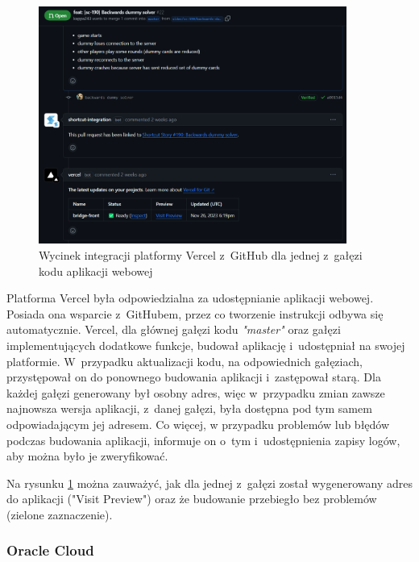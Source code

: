 \begin{figure}[!]
    \centering
    \includegraphics[width=0.9\textwidth]{img/github/github-vercel.png}
    \caption{Wycinek integracji platformy Vercel z~GitHub dla jednej z~gałęzi kodu aplikacji webowej}
    \label{fig:github-vercel}
\end{figure}

Platforma Vercel\cite{Vercel} była odpowiedzialna za
udostępnianie aplikacji webowej. Posiada ona wsparcie \mbox{z~GitHubem},
przez co tworzenie instrukcji odbywa się automatycznie.
Vercel, dla głównej gałęzi kodu \textit{"master"} oraz
gałęzi implementujących dodatkowe funkcje, budował aplikację
i~udostępniał na swojej platformie. W~przypadku aktualizacji
kodu, na odpowiednich gałęziach, przystępował on do ponownego
budowania aplikacji i~zastępował starą. Dla każdej gałęzi
generowany był osobny adres, więc w~przypadku zmian zawsze
najnowsza wersja aplikacji, z~danej gałęzi, była dostępna pod
tym samem odpowiadającym jej adresem. Co więcej, w przypadku
problemów lub błędów podczas budowania aplikacji, informuje
on o~tym i~udostępnienia zapisy logów, aby można było je
zweryfikować.

Na rysunku
\ref{fig:github-vercel} można zauważyć, jak dla jednej
z~gałęzi został wygenerowany adres do aplikacji
("Visit Preview") oraz że budowanie przebiegło bez problemów
(zielone zaznaczenie).

\FloatBarrier


\subsubsection{Oracle Cloud}

